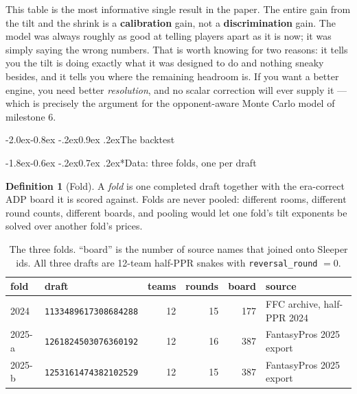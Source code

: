 \documentclass[10pt,a4paper]{article}
\makeatletter
\theoremstyle{plain}
\theoremstyle{definition}
\newtheorem{definition}[theorem]{Definition}
\theoremstyle{remark}
\newcommand{\code}[1]{\texttt{\small #1}}
\renewcommand\subsection{\@startsection{subsection}{2}{\z@}%
  {-2.0ex\@plus -0.8ex \@minus -.2ex}{0.9ex \@plus .2ex}{\normalfont\large\bfseries}}
\renewcommand\subsubsection{\@startsection{subsubsection}{3}{\z@}%
  {-1.8ex\@plus -0.6ex \@minus -.2ex}{0.7ex \@plus .2ex}{\normalfont\normalsize\bfseries}}
\makeatother
\begin{document}
This table is the most informative single result in the paper. The entire gain from the
tilt and the shrink is a \textbf{calibration} gain, not a
\textbf{discrimination} gain. The model was always roughly as good at telling players
apart as it is now; it was simply saying the wrong numbers. That is worth knowing for
two reasons: it tells you the tilt is doing exactly what it was designed to do and
nothing sneaky besides, and it tells you where the remaining headroom is. If you want a
better engine, you need better \emph{resolution}, and no scalar correction will ever
supply it --- which is precisely the argument for the opponent-aware Monte Carlo model
of milestone 6.

\subsection{The backtest}
\label{sec:backtest}

\subsubsection*{Data: three folds, one per draft}

\begin{definition}[Fold]
A \emph{fold} is one completed draft together with the era-correct ADP board it is scored
against. Folds are never pooled: different rooms, different round counts, different
boards, and pooling would let one fold's tilt exponents be solved over another fold's
prices.
\end{definition}

\begin{table}[htbp]
\centering
\small
\begin{tabular}{llrrrl}
\toprule
fold & draft & teams & rounds & board & source \\
\midrule
2024   & \code{1133489617308684288} & 12 & 15 & 177 & FFC archive, half-PPR 2024 \\
2025-a & \code{1261824503076360192} & 12 & 16 & 387 & FantasyPros 2025 export \\
2025-b & \code{1253161474382102529} & 12 & 15 & 387 & FantasyPros 2025 export \\
\bottomrule
\end{tabular}
\caption{The three folds. ``board'' is the number of source names that joined onto Sleeper
ids. All three drafts are 12-team half-PPR snakes with \code{reversal\_round} $=0$.}
\label{tab:folds}
\end{table}
\end{document}
